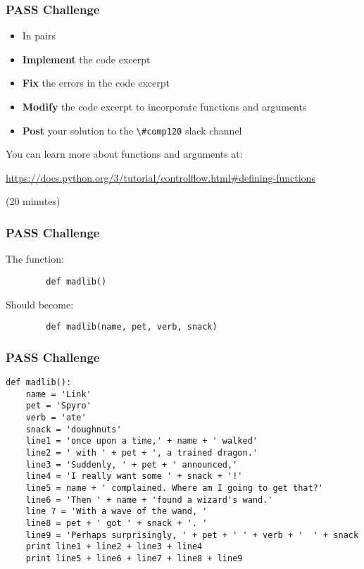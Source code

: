 \begin{frame}
	\frametitle{PASS Challenge}
	
	\begin{itemize}
		\item In pairs
		\item \textbf{Implement} the code excerpt
		\item \textbf{Fix} the errors in the code excerpt
		\item \textbf{Modify} the code excerpt to incorporate functions and arguments
		\item \textbf{Post} your solution to the \lstinline{\#comp120} slack channel
	\end{itemize}
	
	You can learn more about functions and arguments at:
	
	\vspace{1em}
	
	 \url{https://docs.python.org/3/tutorial/controlflow.html\#defining-functions}
	
	\vspace{1em}
	
	(20 minutes)
	
\end{frame}

\begin{frame}[fragile]
	\frametitle{PASS Challenge}
		
	The function:

	\begin{lstlisting}
		def madlib()
	\end{lstlisting}
	
	\vspace{1.5em}
	
	Should become:
	
	\begin{lstlisting}
		def madlib(name, pet, verb, snack)
	\end{lstlisting}
	
\end{frame}

\begin{frame}[fragile]
	\frametitle{PASS Challenge}
	
	\begin{lstlisting}
def madlib():
	name = 'Link'
	pet = 'Spyro'
	verb = 'ate'
	snack = 'doughnuts'
	line1 = 'once upon a time,' + name + ' walked'
	line2 = ' with ' + pet + ', a trained dragon.'
	line3 = 'Suddenly, ' + pet + ' announced,'
	line4 = 'I really want some ' + snack + '!'
	line5 = name + ' complained. Where am I going to get that?'
	line6 = 'Then ' + name + 'found a wizard's wand.'
	line 7 = 'With a wave of the wand, '
	line8 = pet + ' got ' + snack + '. '
	line9 = 'Perhaps surprisingly, ' + pet + ' ' + verb + '  ' + snack
	print line1 + line2 + line3 + line4
	print line5 + line6 + line7 + line8 + line9
\end{lstlisting}
	
\end{frame}

